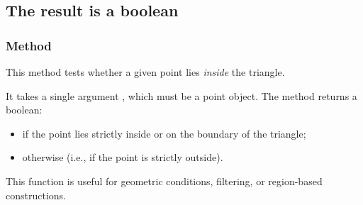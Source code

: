 \begin{minipage}{.5\textwidth}
\let\tul\tkzUseLua
\begin{center}
\end{center}
\end{minipage}
\begin{minipage}{.5\textwidth}
\begin{tkzexample}
\end{tkzexample}
\end{minipage}

\subsection{The result is a boolean}


\subsubsection{Method }
\label{ssub:_triangle_in__out_pt}

This method tests whether a given point lies \emph{inside} the triangle.

\medskip
\noindent
It takes a single argument , which must be a point object. The method returns a boolean:
\begin{itemize}
  \item {} if the point lies strictly inside or on the boundary of the triangle;
  \item {} otherwise (i.e., if the point is strictly outside).
\end{itemize}

\medskip
\noindent
This function is useful for geometric conditions, filtering, or region-based constructions.

